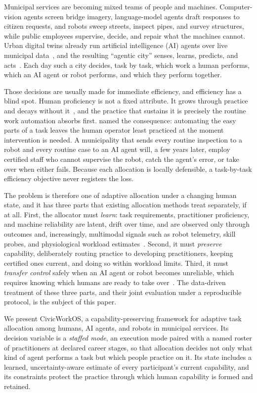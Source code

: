 \documentclass[utf8]{FrontiersinHarvard}
\begin{document}
	Municipal services are becoming mixed teams of people and machines. Computer-vision agents screen bridge imagery, language-model agents draft responses to citizen requests, and robots sweep streets, inspect pipes, and survey structures, while public employees supervise, decide, and repair what the machines cannot. Urban digital twins already run artificial intelligence (AI) agents over live municipal data~\citep{Choi2025}, and the resulting ``agentic city'' senses, learns, predicts, and acts~\citep{Shariatpour2026}. Each day such a city decides, task by task, which work a human performs, which an AI agent or robot performs, and which they perform together.

	Those decisions are usually made for immediate efficiency, and efficiency has a blind spot. Human proficiency is not a fixed attribute. It grows through practice and decays without it~\citep{Arthur1998,TatelAckerman2025}, and the practice that sustains it is precisely the routine work automation absorbs first. \citet{Bainbridge1983} named the consequence: automating the easy parts of a task leaves the human operator least practiced at the moment intervention is needed. A municipality that sends every routine inspection to a robot and every routine case to an AI agent will, a few years later, employ certified staff who cannot supervise the robot, catch the agent's error, or take over when either fails. Because each allocation is locally defensible, a task-by-task efficiency objective never registers the loss.

	The problem is therefore one of adaptive allocation under a changing human state, and it has three parts that existing allocation methods treat separately, if at all. First, the allocator must \textit{learn}: task requirements, practitioner proficiency, and machine reliability are latent, drift over time, and are observed only through outcomes and, increasingly, multimodal signals such as robot telemetry, skill probes, and physiological workload estimates~\citep{Dehais2020,Debie2021}. Second, it must \textit{preserve} capability, deliberately routing practice to developing practitioners, keeping certified ones current, and doing so within workload limits. Third, it must \textit{transfer control} safely when an AI agent or robot becomes unreliable, which requires knowing which humans are ready to take over~\citep{Gold2013,Zhang2019}. The data-driven treatment of these three parts, and their joint evaluation under a reproducible protocol, is the subject of this paper.

	We present CivicWorkOS, a capability-preserving framework for adaptive task allocation among humans, AI agents, and robots in municipal services. Its decision variable is a \textit{staffed mode}, an execution mode paired with a named roster of practitioners at declared career stages, so that allocation decides not only what kind of agent performs a task but which people practice on it. Its state includes a learned, uncertainty-aware estimate of every participant's current capability, and its constraints protect the practice through which human capability is formed and retained.
\end{document}
